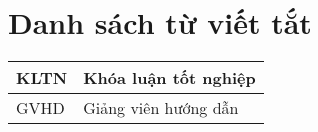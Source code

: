 \chapter*{\centering\Large{Danh sách từ viết tắt}}

\begin{tabular}{| p{} |p{} |}
        \hline
        KLTN &  Khóa luận tốt nghiệp\\
        \hline
        GVHD & Giảng viên hướng dẫn \\
        \hline
\end{tabular} 


